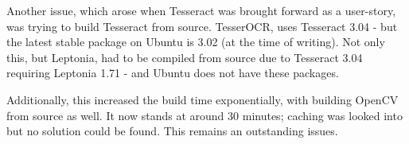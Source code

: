 Another issue, which arose when Tesseract was brought forward as a user-story, was trying to build Tesseract from source. TesserOCR, uses Tesseract 3.04 - but the latest stable package on Ubuntu is 3.02 (at the time of writing). Not only this, but Leptonia, had to be compiled from source due to Tesseract 3.04 requiring Leptonia 1.71 - and Ubuntu does not have these packages.

Additionally, this increased the build time exponentially, with building OpenCV from source as well. It now stands at around 30 minutes; caching was looked into but no solution could be found. This remains an outstanding issues.
